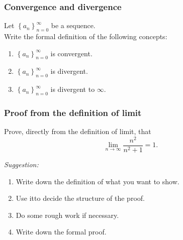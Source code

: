 \documentclass[14pt]{beamer}
\begin{document}
\begin{frame}[t]
	\frametitle{Convergence and divergence}

	Let $\displaystyle \left\{ a_{n} \right\}_{n=0}^{\infty}$ be a sequence. \\ Write
	the formal definition of the following concepts:

	\begin{enumerate}
		\item $\displaystyle \left\{ a_{n} \right\}_{n=0}^{\infty}$ is convergent.

			\vfill

		\item $\displaystyle \left\{ a_{n} \right\}_{n=0}^{\infty}$ is divergent.

			\vfill

		\item $\displaystyle \left\{ a_{n} \right\}_{n=0}^{\infty}$ is divergent to $\infty$.

			\vfill
	\end{enumerate}
\end{frame}

\begin{frame}[t]
	\frametitle{Proof from the definition of limit}

	Prove, directly from the definition of limit, that
	\[
		\lim_{n \to \infty}\frac{n^{2}}{n^{2}+1}= 1.
	\]

	\emph{Suggestion:}
	\begin{enumerate}
		\item Write down the definition of what you want to show.

		\item Use itto decide the structure of the proof.

		\item Do some rough work if necessary.

		\item Write down the formal proof.
	\end{enumerate}
\end{frame}
\end{document}
